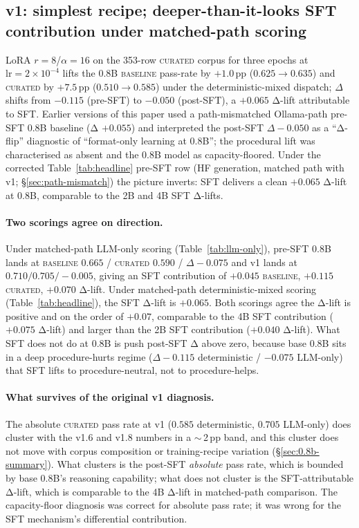 \documentclass[10pt]{article}
\newcommand{\BL}{\textsc{baseline}\xspace}
\newcommand{\CU}{\textsc{curated}\xspace}
\begin{document}
\subsection{v1: simplest recipe; deeper-than-it-looks SFT contribution under matched-path scoring}\label{sec:v1}
LoRA $r{=}8$/$\alpha{=}16$ on the 353-row \CU{} corpus for three epochs at $\mathrm{lr}{=}2{\times}10^{-4}$ lifts the 0.8B \BL{} pass-rate by $+1.0$\,pp ($0.625 \to 0.635$) and \CU{} by $+7.5$\,pp ($0.510 \to 0.585$) under the deterministic-mixed dispatch; $\Delta$ shifts from $-0.115$ (pre-SFT) to $-0.050$ (post-SFT), a $+0.065$ Δ-lift attributable to SFT. Earlier versions of this paper used a path-mismatched Ollama-path pre-SFT 0.8B baseline (Δ $+0.055$) and interpreted the post-SFT $\Delta -0.050$ as a ``Δ-flip'' diagnostic of ``format-only learning at 0.8B''; the procedural lift was characterised as absent and the 0.8B model as capacity-floored. Under the corrected Table~\ref{tab:headline} pre-SFT row (HF generation, matched path with v1; \S\ref{sec:path-mismatch}) the picture inverts: SFT delivers a clean $+0.065$ Δ-lift at 0.8B, comparable to the 2B and 4B SFT Δ-lifts.

\paragraph{Two scorings agree on direction.} Under matched-path LLM-only scoring (Table~\ref{tab:llm-only}), pre-SFT 0.8B lands at \BL{} $0.665$ / \CU{} $0.590$ / $\Delta -0.075$ and v1 lands at $0.710 / 0.705 / -0.005$, giving an SFT contribution of $+0.045$ \BL, $+0.115$ \CU, $+0.070$ Δ-lift. Under matched-path deterministic-mixed scoring (Table~\ref{tab:headline}), the SFT Δ-lift is $+0.065$. Both scorings agree the Δ-lift is positive and on the order of $+0.07$, comparable to the 4B SFT contribution ($+0.075$ Δ-lift) and larger than the 2B SFT contribution ($+0.040$ Δ-lift). What SFT does not do at 0.8B is push post-SFT Δ above zero, because base 0.8B sits in a deep procedure-hurts regime ($\Delta -0.115$ deterministic / $-0.075$ LLM-only) that SFT lifts to procedure-neutral, not to procedure-helps.

\paragraph{What survives of the original v1 diagnosis.} The absolute \CU{} pass rate at v1 ($0.585$ deterministic, $0.705$ LLM-only) does cluster with the v1.6 and v1.8 numbers in a $\sim$\,2\,pp band, and this cluster does not move with corpus composition or training-recipe variation (\S\ref{sec:0.8b-summary}). What clusters is the post-SFT \emph{absolute} pass rate, which is bounded by base 0.8B's reasoning capability; what does not cluster is the SFT-attributable Δ-lift, which is comparable to the 4B Δ-lift in matched-path comparison. The capacity-floor diagnosis was correct for absolute pass rate; it was wrong for the SFT mechanism's differential contribution.
\end{document}
